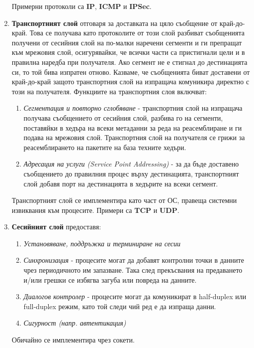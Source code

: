 \documentclass[fleqn,12pt]{article}
\begin{document}
\begin{flushleft}
\begin{enumerate}
\begin{enumerate}
    \end{enumerate}
    Примерни протоколи са \textbf{IP}, \textbf{ICMP} и \textbf{IPSec}.
    \item \textbf{Транспортният слой} отговаря за доставката на цяло съобщение от край-до-край.
    Това се получава като протоколите от този слой разбиват съобщенията получени от сесийния слой на по-малки наречени сегменти и ги препращат към мрежовия слой,
    осигурявайки, че всички части са пристигнали цели и в правилна наредба при получателя. Ако сегмент не е стигнал до дестинацията си, то той бива изпратен отново.
    Казваме, че съобщенията биват доставени от край-до-край защото транспортния слой на изпращача комуникира директно с този на получателя.
    Функциите на транспортния слоя включват:
    \begin{enumerate}
        \item \textit{Сегментация и повторно сглобяване} - транспортния слой на изпращача получава съобщението от сесийния слой, разбива го на сегменти, поставяйки в хедъра на всеки метаданни за реда на реасемблиране и ги подава на мрежовия слой.
        Транспортния слой на получателя се грижи за реасемблирането на пакетите на база техните хедъри.
        \item \textit{Адресация на услуги (Service Point Addressing)} - за да бъде доставено съобщението до правилния процес върху дестинацията, транспортният слой добавя порт на дестинацията в хедърите на всеки сегмент.
    \end{enumerate}
    Транспортният слой се имплементира като част от ОС, правеща системни извиквания към процесите. Примери са \textbf{TCP} и \textbf{UDP}.
    \item \textbf{Сесийният слой} предоставя:
    \begin{enumerate}
        \item \textit{Установяване, поддръжка и терминиране на сесии}
        \item \textit{Синхронизация} - процесите могат да добавят контролни точки в данните чрез периодичното им запазване.
        Така след прекъсвания на предаването и/или грешки се избягва загуба или повреда на данните.
        \item \textit{Диалогов контролер} - процесите могат да комуникират в half-duplex или full-duplex режим, като той следи чий ред е да изпраща данни.
        \item \textit{Сигурност (напр. автентикация)}
    \end{enumerate}
    Обичайно се имплементира чрез сокети.

\end{enumerate}
\end{flushleft}
\end{document}

